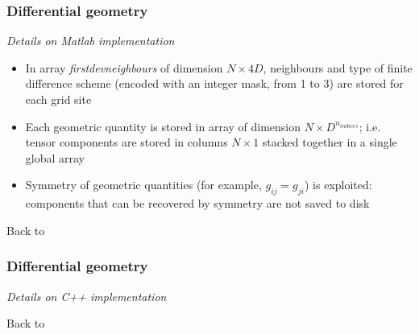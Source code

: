 \documentclass[first,firstsupp,lastsupp,handout,last,hyperref,table]{ETHclass}
\begin{document}
\begin{frame}[label=diffgeom_matlab_details]
\frametitle{Differential geometry}
\vspace{-0.3cm}
\centering
\textit{Details on Matlab implementation}
\vspace{0.25cm}
\begin{itemize}
\item In array \textit{firstdevneighbours} of dimension $N\times4D$, neighbours and type of finite difference scheme (encoded with an integer mask, from 1 to 3) are stored for each grid site
\item Each geometric quantity is stored in array of dimension $N\times D^{n_{indices}}$; i.e. tensor components are stored in columns $N\times 1$ stacked together in a single global array
\item Symmetry of geometric quantities (for example, $g_{ij}=g_{ji}$) is exploited: components that can be recovered by symmetry are not saved to disk
\end{itemize}
{\raggedleft
Back to \hyperlink{diffgeom}{}
}
\end{frame}

\begin{frame}[label=diffgeom_cpp_details]
\frametitle{Differential geometry}
\vspace{-0.3cm}
\centering
\textit{Details on C++ implementation}
\vspace{0.25cm}

{\raggedleft
Back to \hyperlink{diffgeom}{}
}
\end{frame}
\end{document}
